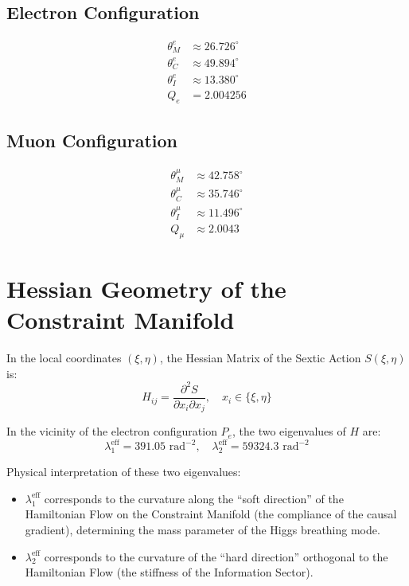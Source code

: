 \documentclass[aps,prd,reprint,nofootinbib]{revtex4-2}
\begin{document}
\subsection{Electron Configuration}
\begin{align}
\theta_M^e &\approx 26.726^\circ \\
\theta_C^e &\approx 49.894^\circ \\
\theta_I^e &\approx 13.380^\circ \\
Q_e &= 2.004256
\end{align}

\subsection{Muon Configuration}
\begin{align}
\theta_M^\mu &\approx 42.758^\circ \\
\theta_C^\mu &\approx 35.746^\circ \\
\theta_I^\mu &\approx 11.496^\circ \\
Q_\mu &\approx 2.0043
\end{align}

\section{Hessian Geometry of the Constraint Manifold}
\label{app:hessian_brief}

In the local coordinates $(\xi, \eta)$, the Hessian Matrix of the Sextic Action $S(\xi, \eta)$ is:
\begin{equation}
H_{ij} = \frac{\partial^2 S}{\partial x_i \partial x_j}, \quad x_i \in \{\xi, \eta\}
\end{equation}

In the vicinity of the electron configuration $P_e$, the two eigenvalues of $H$ are:
\begin{equation}
\lambda_1^{\text{eff}} = 391.05 \text{ rad}^{-2}, \quad \lambda_2^{\text{eff}} = 59324.3 \text{ rad}^{-2}
\end{equation}

Physical interpretation of these two eigenvalues:
\begin{itemize}
\item $\lambda_1^{\text{eff}}$ corresponds to the curvature along the ``soft direction'' of the Hamiltonian Flow on the Constraint Manifold (the compliance of the causal gradient), determining the mass parameter of the Higgs breathing mode.
\item $\lambda_2^{\text{eff}}$ corresponds to the curvature of the ``hard direction'' orthogonal to the Hamiltonian Flow (the stiffness of the Information Sector).
\end{itemize}
\end{document}
